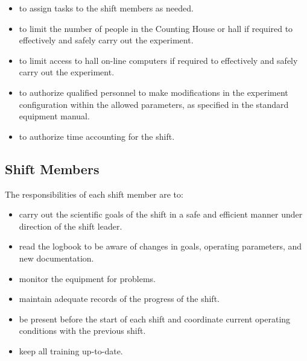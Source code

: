 \documentclass[10pt]{article}
\begin{document}
\begin{itemize}

\item to assign tasks to the shift members as needed.

%
%

\item to limit the number of people in the Counting House or hall 
if required to effectively and safely carry out the experiment.

\item to limit access to hall on-line computers if required to
effectively and safely carry out the experiment.

\item to authorize qualified personnel to make modifications in the experiment
configuration within the allowed parameters, as specified in the standard equipment
manual.

\item to authorize time accounting for the shift.

\end{itemize}

\subsection{Shift Members}

The responsibilities of each shift member are to:
\begin{itemize}

\item carry out the scientific goals of the shift in a safe and efficient
 manner under direction of the shift leader.

\item read the logbook to be aware of changes in goals, operating
parameters, and new documentation.

\item monitor the equipment for problems.

\item maintain adequate records of the progress of the shift.

\item be present before the start of each shift and 
coordinate current operating conditions with the previous shift.

\item keep all training up-to-date.

\end{itemize}
\end{document}
